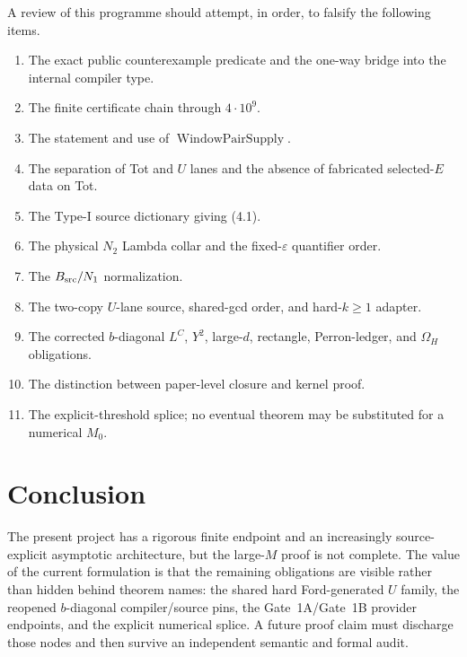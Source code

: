 \documentclass[11pt]{article}
\theoremstyle{definition}
\newcommand{\1}{\mathbf 1}
\newcommand{\WPS}{\operatorname{WindowPairSupply}}
\begin{document}
A review of this programme should attempt, in order, to falsify the following items.
\begin{enumerate}[leftmargin=*]
\item The exact public counterexample predicate and the one-way bridge into the internal compiler type.
\item The finite certificate chain through $4\cdot10^9$.
\item The statement and use of $\WPS$.
\item The separation of Tot and $U$ lanes and the absence of fabricated selected-$E$ data on Tot.
\item The Type-I source dictionary giving (4.1).
\item The physical $N_2$ Lambda collar and the fixed-$\varepsilon$ quantifier order.
\item The $B_{\rm src}/N_1$ normalization.
\item The two-copy $U$-lane source, shared-gcd order, and hard-$k\ge1$ adapter.
\item The corrected $b$-diagonal $L^C$, $Y^2$, large-$d$, rectangle, Perron-ledger, and $\Omega_H$ obligations.
\item The distinction between paper-level closure and kernel proof.
\item The explicit-threshold splice; no eventual theorem may be substituted for a numerical $M_0$.
\end{enumerate}

\section{Conclusion}

The present project has a rigorous finite endpoint and an increasingly source-explicit asymptotic architecture, but the large-$M$ proof is not complete. The value of the current formulation is that the remaining obligations are visible rather than hidden behind theorem names: the shared hard Ford-generated $U$ family, the reopened $b$-diagonal compiler/source pins, the Gate~1A/Gate~1B provider endpoints, and the explicit numerical splice. A future proof claim must discharge those nodes and then survive an independent semantic and formal audit.
\end{document}
